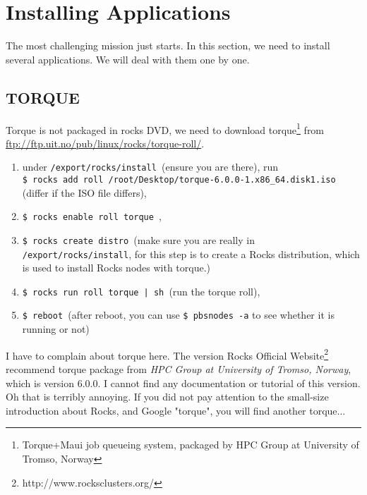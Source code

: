 \section{Installing Applications}
The most challenging mission just starts. In this section, we need to install several applications. We will deal with them one by one.
\subsection{TORQUE}
Torque is not packaged in rocks DVD, we need to download torque\footnote{Torque+Maui job queueing system, packaged by HPC Group at University of Tromso, Norway} from \url{ftp://ftp.uit.no/pub/linux/rocks/torque-roll/}.
\begin{enumerate}
\item under {\tt /export/rocks/install }(ensure you are there), run \\ {\tt \$ rocks add roll /root/Desktop/torque-6.0.0-1.x86\_64.disk1.iso } (differ if the ISO file differs),
\item {\tt \$ rocks enable roll torque },
\item {\tt \$ rocks create distro }(make sure you are really in {\tt /export/rocks/install}, for this step is to create a Rocks distribution, which is used to install Rocks nodes with torque.)
\item {\tt \$ rocks run roll torque | sh }(run the torque roll),
\item {\tt \$ reboot }(after reboot, you can use {\tt \$ pbsnodes -a} to see whether it is running or not)
\end{enumerate}
\begin{remark}
I have to complain about torque here. The version Rocks Official Website\footnote{http://www.rocksclusters.org/} recommend torque package from {\it HPC Group at University of Tromso, Norway}, which is version 6.0.0. I cannot find any documentation or tutorial of this version. Oh that is terribly annoying. If you did not pay attention to the small-size introduction about Rocks, and Google "torque", you will find another torque...
\end{remark}
